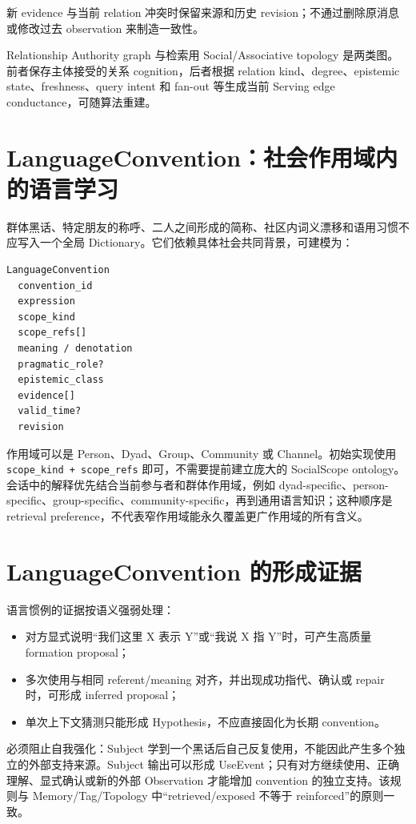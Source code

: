 新 evidence 与当前 relation 冲突时保留来源和历史 revision；不通过删除原消息或修改过去 observation 来制造一致性。

Relationship Authority graph 与检索用 Social/Associative topology 是两类图。前者保存主体接受的关系 cognition，后者根据 relation kind、degree、epistemic state、freshness、query intent 和 fan-out 等生成当前 Serving edge conductance，可随算法重建。

\section{LanguageConvention：社会作用域内的语言学习}

群体黑话、特定朋友的称呼、二人之间形成的简称、社区内词义漂移和语用习惯不应写入一个全局 Dictionary。它们依赖具体社会共同背景，可建模为：

\begin{verbatim}
LanguageConvention
  convention_id
  expression
  scope_kind
  scope_refs[]
  meaning / denotation
  pragmatic_role?
  epistemic_class
  evidence[]
  valid_time?
  revision
\end{verbatim}

作用域可以是 Person、Dyad、Group、Community 或 Channel。初始实现使用 \texttt{scope\_kind + scope\_refs} 即可，不需要提前建立庞大的 SocialScope ontology。会话中的解释优先结合当前参与者和群体作用域，例如 dyad-specific、person-specific、group-specific、community-specific，再到通用语言知识；这种顺序是 retrieval preference，不代表窄作用域能永久覆盖更广作用域的所有含义。

\section{LanguageConvention 的形成证据}

语言惯例的证据按语义强弱处理：

\begin{itemize}
\item 对方显式说明“我们这里 X 表示 Y”或“我说 X 指 Y”时，可产生高质量 formation proposal；
\item 多次使用与相同 referent/meaning 对齐，并出现成功指代、确认或 repair 时，可形成 inferred proposal；
\item 单次上下文猜测只能形成 Hypothesis，不应直接固化为长期 convention。
\end{itemize}

必须阻止自我强化：Subject 学到一个黑话后自己反复使用，不能因此产生多个独立的外部支持来源。Subject 输出可以形成 UseEvent；只有对方继续使用、正确理解、显式确认或新的外部 Observation 才能增加 convention 的独立支持。该规则与 Memory/Tag/Topology 中“retrieved/exposed 不等于 reinforced”的原则一致。

